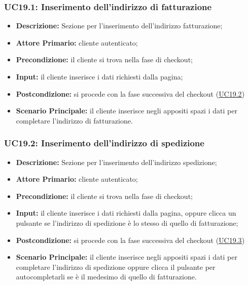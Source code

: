 \subsubsection{UC19.1: Inserimento dell'indirizzo di fatturazione}
\label{sec:UC19.1}
\begin{itemize}
    \item \textbf{Descrizione:} Sezione per l'inserimento dell'indirizzo fatturazione;
    \item \textbf{Attore Primario:} cliente autenticato;
    \item \textbf{Precondizione:} il cliente si trova nella fase di checkout;
    \item \textbf{Input:} il cliente inserisce i dati richiesti dalla pagina;
    \item \textbf{Postcondizione:} si procede con la fase successiva del checkout (\hyperref[sec:UC19.2]{\underline{UC19.2}})
    \item \textbf{Scenario Principale:} il cliente inserisce negli appositi spazi i dati per completare l'indirizzo di fatturazione.
\end{itemize}
\subsubsection{UC19.2: Inserimento dell'indirizzo di spedizione}
\label{sec:UC19.2}
\begin{itemize}
    \item \textbf{Descrizione:} Sezione per l'inserimento dell'indirizzo spedizione;
    \item \textbf{Attore Primario:} cliente autenticato;
    \item \textbf{Precondizione:} il cliente si trova nella fase di checkout;
    \item \textbf{Input:} il cliente inserisce i dati richiesti dalla pagina, oppure clicca un pulsante se l'indirizzo di spedizione è lo stesso di quello di fatturazione;
    \item \textbf{Postcondizione:} si procede con la fase successiva del checkout (\hyperref[sec:UC19.3]{\underline{UC19.3}})
    \item \textbf{Scenario Principale:} il cliente inserisce negli appositi spazi i dati per completare l'indirizzo di spedizione oppure clicca il pulsante per autocompletarli se è il medesimo di quello di fatturazione.
\end{itemize}
